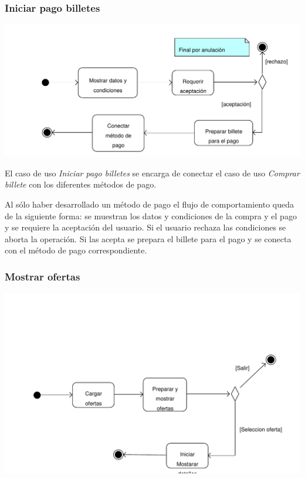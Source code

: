 \documentclass[11pt, a4paper, twoside, titlepage]{article}
\begin{document}
			\subsubsection{Iniciar pago billetes}
				\begin{center}
					\includegraphics[scale=.76]{analisis/diagramas/da_iniciarpagobilletes.pdf}
				\end{center}

				El caso de uso {\itshape Iniciar pago billetes} se encarga de conectar el caso de uso {\itshape Comprar billete} con los diferentes métodos de pago.

				Al sólo haber desarrollado un método de pago el flujo de comportamiento queda de la siguiente forma: se muestran los datos y condiciones de la compra y el pago y se requiere la aceptación del usuario. Si el usuario rechaza las condiciones se aborta la operación. Si las acepta se prepara el billete para el pago y se conecta con el método de pago correspondiente.

			\subsubsection{Mostrar ofertas}
				\begin{center}
				\includegraphics[scale=.72]{analisis/diagramas/da_mostrarofertas.pdf}
				\end{center}
\end{document}
